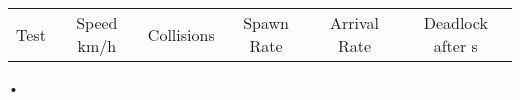\begin{tabular}{l c c c c c}
Test & Speed km/h & Collisions & Spawn Rate & Arrival Rate & Deadlock after s\\

\end{tabular}•